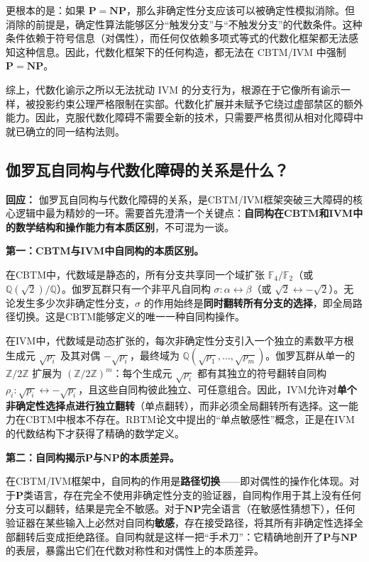 \documentclass{ctexart}
\begin{document}
	更根本的是：如果 $\mathbf{P} = \mathbf{NP}$，那么非确定性分支应该可以被确定性模拟消除。但消除的前提是，确定性算法能够区分``触发分支''与``不触发分支''的代数条件。这种条件依赖于符号信息（对偶性），而任何仅依赖多项式等式的代数化框架都无法感知这种信息。因此，代数化框架下的任何构造，都无法在 CBTM/IVM 中强制 $\mathbf{P} = \mathbf{NP}$。
	
	综上，代数化谕示之所以无法扰动 IVM 的分支行为，根源在于它像所有谕示一样，被投影约束公理严格限制在实部。代数化扩展并未赋予它绕过虚部禁区的额外能力。因此，克服代数化障碍不需要全新的技术，只需要严格贯彻从相对化障碍中就已确立的同一结构法则。
	
	
	\subsection{伽罗瓦自同构与代数化障碍的关系是什么？}
	
	\textbf{回应：} 伽罗瓦自同构与代数化障碍的关系，是CBTM/IVM框架突破三大障碍的核心逻辑中最为精妙的一环。需要首先澄清一个关键点：\textbf{自同构在CBTM和IVM中的数学结构和操作能力有本质区别}，不可混为一谈。
	
	\textbf{第一：CBTM与IVM中自同构的本质区别。}
	
	在CBTM中，代数域是静态的，所有分支共享同一个域扩张 $\mathbb{F}_4/\mathbb{F}_2$（或 $\mathbb{Q}(\sqrt{2})/\mathbb{Q}$）。伽罗瓦群只有一个非平凡自同构 $\sigma: \alpha \leftrightarrow \beta$（或 $\sqrt{2} \leftrightarrow -\sqrt{2}$）。无论发生多少次非确定性分支，$\sigma$ 的作用始终是\textbf{同时翻转所有分支的选择}，即全局路径切换。这是CBTM能够定义的唯一一种自同构操作。
	
	在IVM中，代数域是动态扩张的，每次非确定性分支引入一个独立的素数平方根生成元 $\sqrt{p_i}$ 及其对偶 $-\sqrt{p_i}$，最终域为 $\mathbb{Q}(\sqrt{p_1}, \dots, \sqrt{p_m})$。伽罗瓦群从单一的 $\mathbb{Z}/2\mathbb{Z}$ 扩展为 $(\mathbb{Z}/2\mathbb{Z})^m$：每个生成元 $\sqrt{p_i}$ 都有其独立的符号翻转自同构 $\rho_i: \sqrt{p_i} \leftrightarrow -\sqrt{p_i}$，且这些自同构彼此独立、可任意组合。因此，IVM允许对\textbf{单个非确定性选择点进行独立翻转}（单点翻转），而非必须全局翻转所有选择。这一能力在CBTM中根本不存在。RBTM论文中提出的``单点敏感性''概念，正是在IVM的代数结构下才获得了精确的数学定义。
	
	\textbf{第二：自同构揭示$\mathbf{P}$与$\mathbf{NP}$的本质差异。}
	
	在CBTM/IVM框架中，自同构的作用是\textbf{路径切换}——即对偶性的操作化体现。对于$\mathbf{P}$类语言，存在完全不使用非确定性分支的验证器，自同构作用于其上没有任何分支可以翻转，结果是完全不敏感。对于$\mathbf{NP}$完全语言（在敏感性猜想下），任何验证器在某些输入上必然对自同构\textbf{敏感}，存在接受路径，将其所有非确定性选择全部翻转后变成拒绝路径。自同构就是这样一把``手术刀''：它精确地剖开了$\mathbf{P}$与$\mathbf{NP}$的表层，暴露出它们在代数对称性和对偶性上的本质差异。
	
\end{document}
